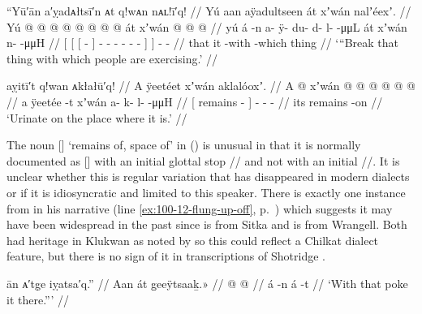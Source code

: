 \ex\label{ex:93-35-break-that-thing}%
%
\begingl
	\glpreamble	“Yū′ān a′ỵadᴀłtsī′n ᴀt q!wᴀn nᴀʟ!ī′q! //
	\glpreamble	Yú aan aÿadultseen át xʼwán nalʼéexʼ. //
	\gla	{} Yú {} {}  @ {} {}
			 @ {} @ {} @ {} @ {} @ {} @ {} @ {} {} át {}
		xʼwán
		 @ {} @ {} @ {} //
	\glb	{} yú {} {} á -n {}
			a- ÿ- du- d- l-  -μμL {} {} át {}
		xʼwán
		n- {}  -μμH //
	\glc	{}[  {}[ {}[  - {}]
			- - - - -  - \· {}]  {}]
		- \·  - //
	\gld	{} that {} {} it -with {}
			 {} {} {} {} {} {} -which {} thing {}
		 {} {} {} //
	\glft	‘“Break that thing with which people are exercising.’
		//
\endgl
\xe

\ex\label{ex:93-36-piss-on-it}%
%
\begingl
	\glpreamble	aỵitī′t q!wan ᴀkłałū′q! //
	\glpreamble	A ÿeetéet xʼwán aklalóoxʼ. //
	\gla	{} A  @ {} {}
		xʼwán
		 @ {} @ {} @ {} @ {} @ {} @ {} //
	\glb	{} a ÿeetée -t {}
		xʼwán
		a- k- {} {} l-  -μμH //
	\glc	{}[  remains - {}]
		- - \· \·  - //
	\gld	{} its remains -on {}
		 {} {} {} {} {} {} //
	\glft	‘Urinate on the place where it is.’
		//
\endgl
\xe

The noun  [] ‘remains of, space of’ in (\lastx) is unusual in that it is normally documented as  [] with an initial glottal stop // and not with an initial //.
It is unclear whether this is regular variation that has disappeared in modern dialects or if it is idiosyncratic and limited to this speaker.
There is exactly one instance from  in his  narrative (line \ref{ex:100-12-flung-up-off}, p.\ \pageref{ex:100-12-flung-up-off}) which suggests it may have been widespread in the past since  is from Sitka and  is from Wrangell.
Both had heritage in Klukwan as noted by \textcite{jones:2017} so this could reflect a Chilkat dialect feature, but there is no sign of it in transcriptions of Shotridge \parencite{boas:1917}.

\ex\label{ex:93-37-poke-it-there}%
%
\begingl
	\glpreamble	ān ᴀ′tg̣e iỵatsa′q.” //
	\glpreamble	Aan át g̱eeÿtsaaḵ.\!» //
	\gla	{}  @ {} {}
		{}  @ {} {}
		 //
	\glb	{} á -n {}
		{} á -t {}
		//
	\glft	‘With that poke it there.”’
		//
\endgl
\xe

